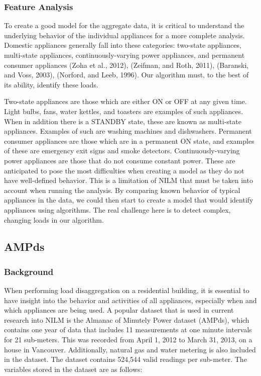 \documentclass[11pt,twocolumn]{article}
\begin{document}
			\subsubsection*{Feature Analysis}
			\quad To create a good model for the aggregate data, it is critical to understand the underlying behavior of the individual appliances for a more complete analysis. Domestic appliances generally fall into these categories: two-state appliances, multi-state appliances, continuously-varying power appliances, and permanent consumer appliances (Zoha et al., 2012), (Zeifman, and Roth, 2011), (Baranski, and Voss, 2003), (Norford, and Leeb, 1996). Our algorithm must, to the best of its ability, identify these loads. \newline

			Two-state appliances are those which are either ON or OFF at any given time. Light bulbs, fans, water kettles, and toasters are examples of such appliances. When in addition there is a STANDBY state, these are known as multi-state appliances. Examples of such are washing machines and dishwashers. Permanent consumer appliances are those which are in a permanent ON state, and examples of these are emergency exit signs and smoke detectors. Continuously-varying power appliances are those that do not consume constant power. These are anticipated to pose the most difficulties when creating a model as they do not have well-defined behavior. This is a limitation of NILM that must be taken into account when running the analysis. By comparing known behavior of typical appliances in the data, we could then start to create a model that would identify appliances using algorithms. The real challenge here is to detect complex, changing loads in our algorithm. 
			
		\subsection{AMPds}

			\subsubsection*{Background}
				\quad When performing load disaggregation on a residential building, it is essential to have insight into the behavior and activities of all appliances, especially when and which appliances are being used. A popular dataset that is used in current research into NILM is the Almanac of Minutely Power dataset (AMPds), which contains one year of data that includes 11 measurements at one minute intervals for 21 sub-meters. This was recorded from April 1, 2012 to March 31, 2013, on a house in Vancouver. Additionally, natural gas and water metering is also included in the dataset. The dataset contains 524,544 valid readings per sub-meter. The variables stored in the dataset are as follows:
\end{document}
